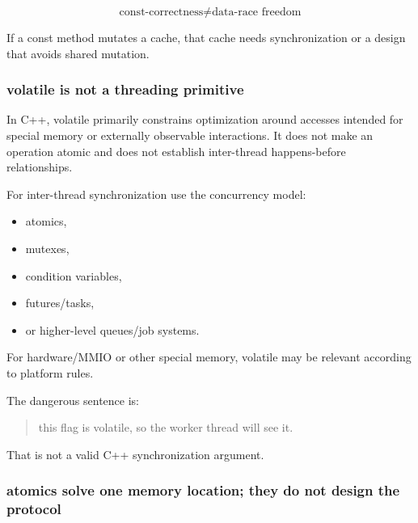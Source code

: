 \[
\boxed{
\text{const-correctness}
\neq
\text{data-race freedom}
}
\]

If a const method mutates a cache, that cache needs synchronization or a design that avoids shared mutation.

\subsubsection{volatile is not a threading primitive}\label{01-foundations-i-ch005-volatile-is-not-a-threading-primitive}

\hypertarget{01-foundations-i-ch005-volatile-is-not-a-threading-primitive}{}

In C++, volatile primarily constrains optimization around accesses intended for special memory or externally observable interactions. It does not make an operation atomic and does not establish inter-thread happens-before relationships.

For inter-thread synchronization use the concurrency model:

\begin{itemize}
\tightlist
\item
  atomics,
\item
  mutexes,
\item
  condition variables,
\item
  futures/tasks,
\item
  or higher-level queues/job systems.
\end{itemize}

For hardware/MMIO or other special memory, volatile may be relevant according to platform rules.

The dangerous sentence is:

\begin{quote}
this flag is volatile, so the worker thread will see it.
\end{quote}

That is not a valid C++ synchronization argument.

\subsubsection{atomics solve one memory location; they do not design the protocol}\label{01-foundations-i-ch005-atomics-solve-one-memory-location-they-do-not-design-the-protocol}

\hypertarget{01-foundations-i-ch005-atomics-solve-one-memory-location-they-do-not-design-the-protocol}{}

